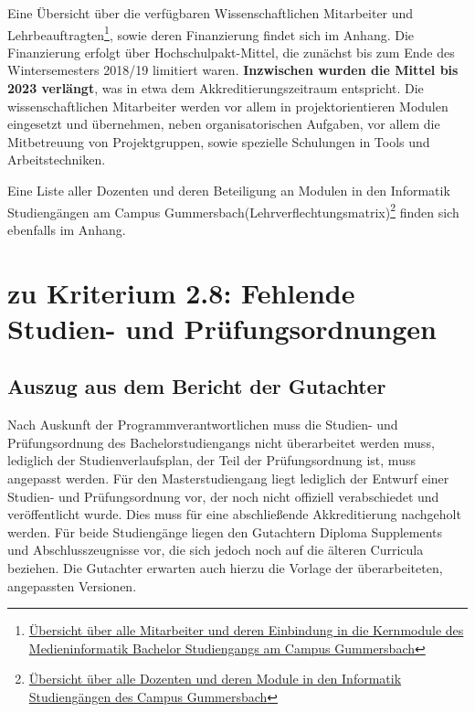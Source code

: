 Eine Übersicht über die verfügbaren Wissenschaftlichen Mitarbeiter und
Lehrbeauftragten\footnote{\href{https://th-koeln.github.io/mi-2017/anhaenge/stellungsnahme/mitarbeiter-und-module-mi-kern-2017.pdf}{Übersicht
  über alle Mitarbeiter und deren Einbindung in die Kernmodule des
  Medieninformatik Bachelor Studiengangs am Campus Gummersbach}}, sowie
deren Finanzierung findet sich im Anhang. Die Finanzierung erfolgt über
Hochschulpakt-Mittel, die zunächst bis zum Ende des Wintersemesters
2018/19 limitiert waren. \textbf{Inzwischen wurden die Mittel bis 2023
verlängt}, was in etwa dem Akkreditierungszeitraum entspricht. Die
wissenschaftlichen Mitarbeiter werden vor allem in projektorientieren
Modulen eingesetzt und übernehmen, neben organisatorischen Aufgaben, vor
allem die Mitbetreuung von Projektgruppen, sowie spezielle Schulungen in
Tools und Arbeitstechniken.

Eine Liste aller Dozenten und deren Beteiligung an Modulen in den
Informatik Studiengängen am Campus
Gummersbach(Lehrverflechtungsmatrix)\footnote{\href{https://th-koeln.github.io/mi-2017/anhaenge/stellungsnahme/dozenten-und-module-2017.pdf}{Übersicht
  über alle Dozenten und deren Module in den Informatik Studiengängen
  des Campus Gummersbach}} finden sich ebenfalls im Anhang.

\section{zu Kriterium 2.8: Fehlende Studien- und
Prüfungsordnungen}\label{zu-kriterium-2.8-fehlende-studien--und-pruxfcfungsordnungen}

\subsection{Auszug aus dem Bericht der
Gutachter}\label{auszug-aus-dem-bericht-der-gutachter-6}

\begin{siderules}
Nach Auskunft der Programmverantwortlichen muss die Studien- und
Prüfungsordnung des Bachelorstudiengangs nicht überarbeitet werden muss,
lediglich der Studienverlaufsplan, der Teil der Prüfungsordnung ist,
muss angepasst werden. Für den Masterstudiengang liegt lediglich der
Entwurf einer Studien- und Prüfungsordnung vor, der noch nicht offiziell
verabschiedet und veröffentlicht wurde. Dies muss für eine abschließende
Akkreditierung nachgeholt werden. Für beide Studiengänge liegen den
Gutachtern Diploma Supplements und Abschlusszeugnisse vor, die sich
jedoch noch auf die älteren Curricula beziehen. Die Gutachter erwarten
auch hierzu die Vorlage der überarbeiteten, angepassten Versionen.
\end{siderules}

